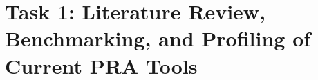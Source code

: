 \section{Task 1: Literature Review, Benchmarking, and Profiling of Current PRA Tools}
\label{sec:task1}

% 



